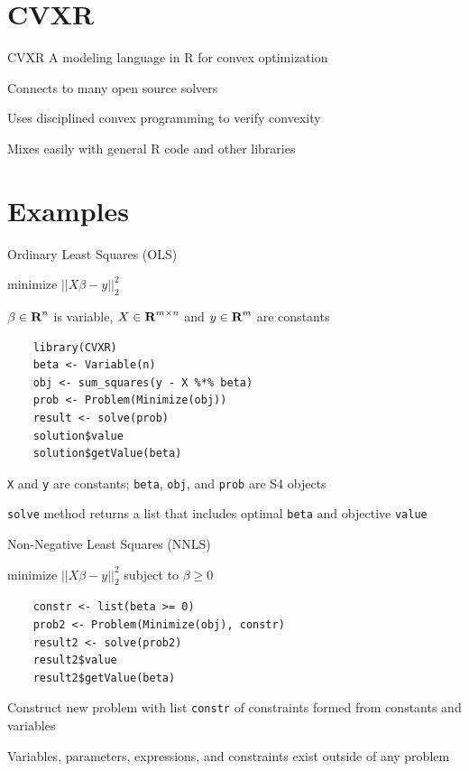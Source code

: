 \documentclass{beamer}
\begin{document}
\section{CVXR}

\begin{frame}{CVXR}
	A modeling language in R for convex optimization
	
	\BIT
		\item Connects to many open source solvers
		\item Uses disciplined convex programming to 
verify convexity
		\item Mixes easily with general R code and other libraries
	\EIT
\end{frame}

\section{Examples}

\begin{frame}[fragile]{Ordinary Least Squares (OLS)}
	\BIT
		\item minimize $||X\beta - y||_2^2$
		\item $\beta \in {\mbox{\bf R}}^n$ is variable, $X \in {\mbox{\bf R}}^{m \times n}$ and $y \in {\mbox{\bf R}}^m$ are constants
	\EIT
	
	\pause
	\begin{verbatim}
	library(CVXR)
	beta <- Variable(n)
	obj <- sum_squares(y - X %*% beta)
	prob <- Problem(Minimize(obj))
	result <- solve(prob)
	solution$value
	solution$getValue(beta)
	\end{verbatim}
	
	\BIT
		\item \verb|X| and \verb|y| are constants; \verb|beta|, \verb|obj|, and \verb|prob| are S4 objects
		\item \verb|solve| method returns a list that includes optimal \verb|beta| and objective \verb|value|
	\EIT
\end{frame}

\begin{frame}[fragile]{Non-Negative Least Squares (NNLS)}
	\BIT
	\item minimize $||X\beta - y||_2^2$ subject to $\beta \geq 0$
	\EIT
	\pause
	\begin{verbatim}
	constr <- list(beta >= 0)
	prob2 <- Problem(Minimize(obj), constr)
	result2 <- solve(prob2)
	result2$value
	result2$getValue(beta)
	\end{verbatim}
	
	\BIT
		\item Construct new problem with list \verb|constr| of constraints formed from constants and variables
		\item Variables, parameters, expressions, and constraints exist outside of any problem
	\EIT
\end{frame}
\end{document}
